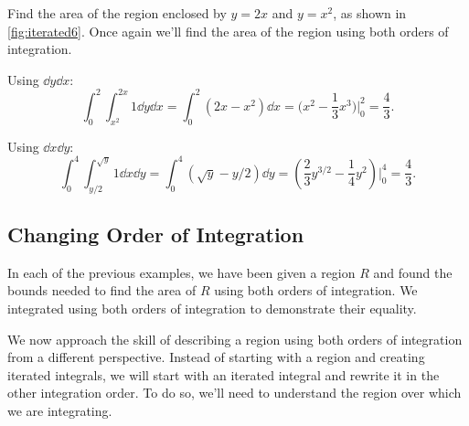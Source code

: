 \begin{example}\label{ex_iterated6}
Find the area of the region enclosed by $y=2x$ and $y=x^2$, as shown in \autoref{fig:iterated6}.
%
\solution
Once again we'll find the area of the region using both orders of integration. 

Using $\dd y\dd x$:
\[
\int_0^2\int_{x^2}^{2x}1\dd y \dd x = \int_0^2(2x-x^2)\dd x
= \bigl(x^2-\frac13x^3\bigr)\Big|_0^2 = \frac43.
\]

Using $\dd x\dd y$:
\[
\int_0^4\int_{y/2}^{\sqrt{y}} 1\dd x\dd y = \int_0^4 (\sqrt{y}-y/2)\dd y
= \left(\frac23y^{3/2} - \frac14y^2\right)\Big|_0^4 = \frac43.
\]
\end{example}

\subsection{Changing Order of Integration}

In each of the previous examples, we have been given a region $R$ and found the bounds needed to find the area of $R$ using both orders of integration. We integrated using both orders of integration to demonstrate their equality.

We now approach the skill of describing a region using both orders of integration from a different perspective. Instead of starting with a region and creating iterated integrals, we will start with an iterated integral and rewrite it in the other integration order. To do so, we'll need to understand the region over which we are integrating.

